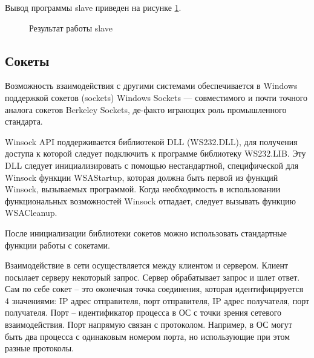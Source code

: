 \documentclass[a4paper]{article}
\begin{document}
	Вывод программы slave приведен на рисунке \ref{img:task5s}.
	\begin{figure}[h!]
		\caption{Результат работы slave}
		\label{img:task5s}
	\end{figure}
	
\subsection{Сокеты}
	Возможность взаимодействия с другими системами обеспечивается в Windows поддержкой сокетов (sockets) Windows Sockets — совместимого и почти точного аналога сокетов Berkeley Sockets, де-факто играющих роль промышленного стандарта.
	
	Winsock API поддерживается библиотекой DLL (WS232.DLL), для получения доступа к которой следует подключить к программе библиотеку WS232.LIB. Эту DLL следует инициализировать с помощью нестандартной, специфической для Winsock функции WSAStartup, которая должна быть первой из функций Winsock, вызываемых программой. Когда необходимость в использовании функциональных возможностей Winsock отпадает, следует вызывать функцию WSACleanup.
	
	После инициализации библиотеки сокетов можно использовать стандартные функции работы с сокетами.
	
	Взаимодействие в сети осуществляется между клиентом и сервером. Клиент посылает серверу некоторый запрос. Сервер обрабатывает запрос и шлет ответ. Сам по себе сокет – это оконечная точка соединения, которая идентифицируется 4 значениями: IP адрес отправителя, порт отправителя, IP адрес получателя, порт получателя. Порт – идентификатор процесса в ОС с точки зрения сетевого взаимодействия. Порт напрямую связан с протоколом. Например, в ОС могут быть два процесса с одинаковым номером порта, но использующие при этом разные протоколы.
	
\end{document}

